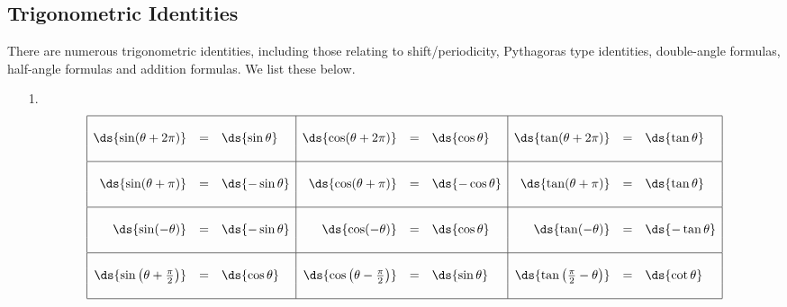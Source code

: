 \subsection{Trigonometric Identities}
There are numerous trigonometric identities, including those relating to shift/periodicity, Pythagoras type identities, double-angle formulas, half-angle formulas and addition formulas.
We list these below.

\begin{enumerate}
\item[1.] 
$$\begin{array}{|rcl|rcl|rcl|}
\hline
~&~&~&~&~&~&~&~&~\\
\ds{\sin (\theta + 2\pi)} & = & \ds{\sin \theta} &
\ds{\cos (\theta + 2\pi)} &= & \ds{\cos \theta} &
\ds{\tan (\theta + 2\pi)} &= & \ds{\tan \theta} \\
~&~&~&~&~&~&~&~&~\\
\hline
~&~&~&~&~&~&~&~&~\\
\ds{\sin (\theta + \pi)} &= & \ds{-\sin \theta} &
\ds{\cos (\theta + \pi)} &= & \ds{-\cos \theta} &
\ds{\tan (\theta + \pi)} &= & \ds{\tan \theta} \\
~&~&~&~&~&~&~&~&~\\
\hline
~&~&~&~&~&~&~&~&~\\
\ds{\sin (-\theta)} &= & \ds{-\sin \theta} & 
\ds{\cos (-\theta)} &= & \ds{\cos \theta} & 
\ds{\tan (-\theta)} &= & \ds{-\tan \theta}  \\
~&~&~&~&~&~&~&~&~\\
\hline
~&~&~&~&~&~&~&~&~\\
\ds{\sin \left(\theta +\frac{\pi}{2}\right) } &= &  \ds{\cos \theta} &
\ds{\cos \left(\theta -\frac{\pi}{2}\right)} &= &  \ds{\sin \theta} &
\ds{\tan \left(\frac{\pi}{2}-\theta\right)} &= & \ds{\cot \theta}  \\
~&~&~&~&~&~&~&~&~\\
\hline
\end{array}$$
\end{enumerate}


